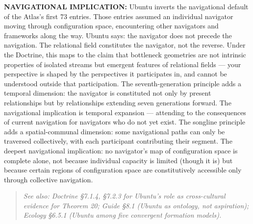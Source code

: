 \textbf{NAVIGATIONAL IMPLICATION:} Ubuntu inverts the navigational default of the Atlas's first 73 entries. Those entries assumed an individual navigator moving through configuration space, encountering other navigators and frameworks along the way. Ubuntu says: the navigator does not precede the navigation. The relational field constitutes the navigator, not the reverse. Under the Doctrine, this maps to the claim that bottleneck geometries are not intrinsic properties of isolated streams but emergent features of relational fields — your perspective is shaped by the perspectives it participates in, and cannot be understood outside that participation. The seventh-generation principle adds a temporal dimension: the navigator is constituted not only by present relationships but by relationships extending seven generations forward. The navigational implication is temporal expansion — attending to the consequences of current navigation for navigators who do not yet exist. The songline principle adds a spatial-communal dimension: some navigational paths can only be traversed collectively, with each participant contributing their segment. The deepest navigational implication: no navigator's map of configuration space is complete alone, not because individual capacity is limited (though it is) but because certain regions of configuration space are constitutively accessible only through collective navigation.


\begin{quote}
\itshape
\textit{See also: Doctrine §7.1.4, §7.2.3 for Ubuntu's role as cross-cultural evidence for Theorem 20; Guide §8.1 (Ubuntu as ontology, not aspiration); Ecology §6.5.1 (Ubuntu among five convergent formation models).}
\end{quote}


\bigskip\noindent\makebox[\textwidth]{\color{rulegray}\rule{5cm}{0.3pt}}\bigskip
